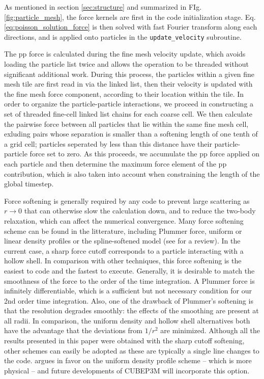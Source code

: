 As mentioned in section \ref{sec:structure} and summarized in FIg. \ref{fig:particle_mesh},
the force kernels are first  in the code initialization stage.
Eq. \ref{eq:poisson_solution_force} is then solved with fast Fourier transform along each directions, 
 and is applied onto particles in the {\tt update\_velocity} subroutine.

The pp force is calculated during the fine mesh velocity update, which avoids loading the particle list twice and allows the operation to be threaded without significant additional work. During this process, the particles within a given fine mesh tile are first read in via the linked list, 
then their velocity is updated with the fine mesh force component, according to their location within the tile. 
In order to organize the particle-particle interactions, we proceed in constructing a set of threaded fine-cell linked list chains for each coarse cell. 
We then calculate the pairwise force between all particles that lie within the same fine mesh cell, exluding pairs whose separation is smaller than a softening length of one tenth of a grid cell; particles seperated by less than this distance have their 
particle-particle force set to zero.  As this proceeds, we accumulate the  pp force applied on each particle and then determine the maximum force element of the pp contribution, which is also taken into account when constraining the length of the global timestep. 

Force softening is generally required by any code to prevent
large scattering as $r \rightarrow 0$ that can otherwise slow the calculation down, 
and to reduce the two-body relaxation, which can affect the numerical convergence. 
Many force softening scheme can be found in the litterature, including Plummer force, uniform or linear density profiles or the spline-softened model 
(see \citet{1993ApJ...409...60D} for a review). In the current case, a sharp force cutoff corresponds to a particle interacting with a hollow shell.
In comparison with other techniques, this  force softening is the easiest to code and the fastest to execute. 
Generally, it is desirable to match the smoothness of the force to the order of the time integration. 
A Plummer force is infinitely differentiable, which is a sufficient but not necessary condition for our 2nd order time integration.  
Also, one of the drawback of Plummer's softening is that the resolution degrades smoothly: the effects of the smoothing are present at all radii. 
In comparison, the uniform density and hollow shell alternatives both have the advantage that the deviations from $1/r^2$ are minimized. 
Although all the results presented in this paper were obtained with the sharp cutoff softening, other schemes can easily be adopted as these 
are typically a single line changes to the code. \citep{1993ApJ...409...60D} argues in favor on the uniform density profile scheme -- which is more physical --
and future developments of {\small CUBEP3M} will incorporate this option.





